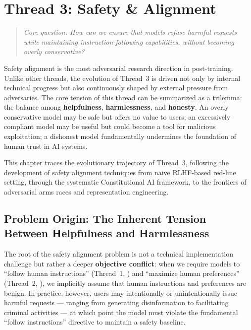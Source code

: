 \section{Thread 3: Safety \& Alignment}
\label{sec:t3}

\begin{quote}
\textit{Core question: How can we ensure that models refuse harmful requests while maintaining instruction-following capabilities, without becoming overly conservative?}
\end{quote}

\noindent
Safety alignment is the most adversarial research direction in post-training.
Unlike other threads, the evolution of Thread~3 is driven not only by internal technical progress
but also continuously shaped by external pressure from adversaries.
The core tension of this thread can be summarized as a trilemma:
the balance among \textbf{helpfulness}, \textbf{harmlessness}, and \textbf{honesty}.
An overly conservative model may be safe but offers no value to users;
an excessively compliant model may be useful but could become a tool for malicious exploitation;
a dishonest model fundamentally undermines the foundation of human trust in AI systems.

This chapter traces the evolutionary trajectory of Thread~3, following the development of safety alignment techniques from naive RLHF-based red-line setting,
through the systematic Constitutional AI framework, to the frontiers of adversarial arms races and representation engineering.

\subsection{Problem Origin: The Inherent Tension Between Helpfulness and Harmlessness}
\label{sec:t3-origin}

The root of the safety alignment problem is not a technical implementation challenge
but rather a deeper \textbf{objective conflict}:
when we require models to ``follow human instructions'' (Thread~1, )
and ``maximize human preferences'' (Thread~2, ),
we implicitly assume that human instructions and preferences are benign.
In practice, however, users may intentionally or unintentionally issue harmful requests ---
ranging from generating disinformation to facilitating criminal activities ---
at which point the model must violate the fundamental ``follow instructions'' directive to maintain a safety baseline.

